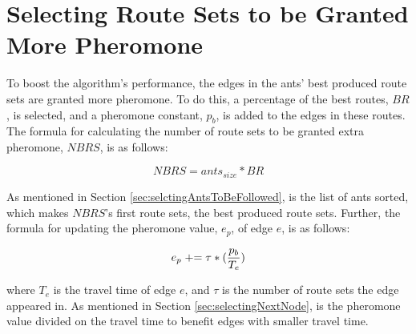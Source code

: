 \section{Selecting Route Sets to be Granted More Pheromone}
To boost the algorithm's performance, the edges in the ants' best produced route sets are granted more pheromone. To do this, a percentage of the best routes, $BR$, is selected, and a pheromone constant, $p_b$, is added to the edges in these routes. 
The formula for calculating the number of route sets to be granted extra pheromone, $NBRS$, is as follows:

$$NBRS = ants_{size} * BR$$

As mentioned in Section \vref{sec:selctingAntsToBeFollowed}, is the list of ants sorted, which makes $NBRS$'s first route sets, the best produced route sets.
Further, the formula for updating the pheromone value, $e_p$, of edge $e$, is as follows:

$$e_p \mathrel{+}= \tau*(\frac{p_b}{T_e})$$ 

where $T_e$ is the travel time of edge $e$, and $\tau$ is the number of route sets the edge appeared in. As mentioned in Section \vref{sec:selectingNextNode}, is the pheromone value divided on the travel time to benefit edges with smaller travel time. 